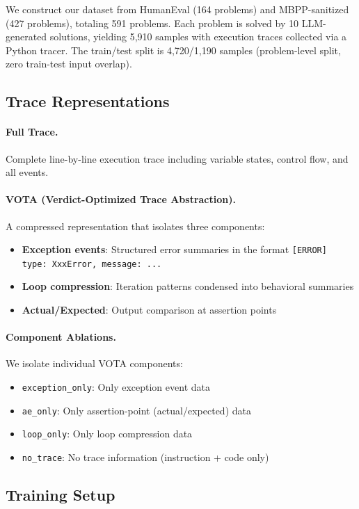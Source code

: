 \documentclass[11pt,a4paper]{article}
\begin{document}
We construct our dataset from HumanEval (164 problems) and MBPP-sanitized (427 problems), totaling 591 problems. Each problem is solved by 10 LLM-generated solutions, yielding 5,910 samples with execution traces collected via a Python tracer. The train/test split is 4,720/1,190 samples (problem-level split, zero train-test input overlap).

\subsection{Trace Representations}

\paragraph{Full Trace.} Complete line-by-line execution trace including variable states, control flow, and all events.

\paragraph{VOTA (Verdict-Optimized Trace Abstraction).} A compressed representation that isolates three components:
\begin{itemize}
    \item \textbf{Exception events}: Structured error summaries in the format \texttt{[ERROR] type: XxxError, message: ...}
    \item \textbf{Loop compression}: Iteration patterns condensed into behavioral summaries
    \item \textbf{Actual/Expected}: Output comparison at assertion points
\end{itemize}

\paragraph{Component Ablations.} We isolate individual VOTA components:
\begin{itemize}
    \item \texttt{exception\_only}: Only exception event data
    \item \texttt{ae\_only}: Only assertion-point (actual/expected) data
    \item \texttt{loop\_only}: Only loop compression data
    \item \texttt{no\_trace}: No trace information (instruction + code only)
\end{itemize}

\subsection{Training Setup}
\end{document}
